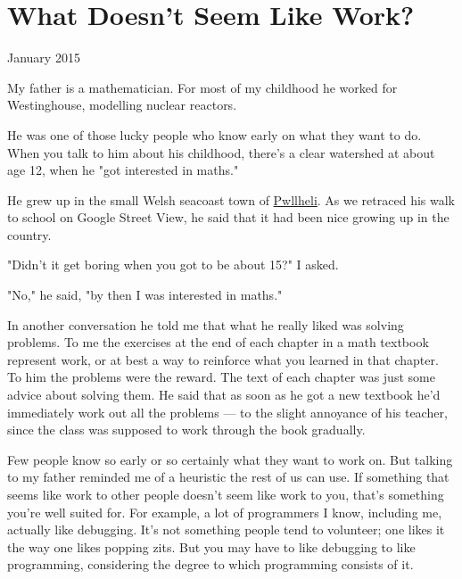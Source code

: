 \chapter{What Doesn't Seem Like Work?}


            
              
                

January 2015

My father is a mathematician. For
                  most of my childhood he worked for Westinghouse, modelling
                  nuclear reactors.

He was one of those lucky people
                  who know early on what they want to do. When you talk to him
                  about his childhood, there's a clear watershed at about age
                  12, when he "got interested in maths."

He grew up
                  in the small Welsh seacoast town of
                  \href{https://goo.gl/maps/rkzUm}{Pwllheli}. As we
                  retraced his walk to school on Google Street View, he said
                  that it had been nice growing up in the country.

"Didn't
                  it get boring when you got to be about 15?" I asked.

"No,"
                  he said, "by then I was interested in maths."

In
                  another conversation he told me that what he really liked was
                  solving problems. To me the exercises at the end of each
                  chapter in a math textbook represent work, or at best a way to
                  reinforce what you learned in that chapter. To him the
                  problems were the reward. The text of each chapter was just
                  some advice about solving them. He said that as soon as he got
                  a new textbook he'd immediately work out all the problems
                  --- to the slight annoyance of his teacher, since the
                  class was supposed to work through the book gradually.

Few
                  people know so early or so certainly what they want to work
                  on. But talking to my father reminded me of a heuristic the
                  rest of us can use. If something that seems like work to other
                  people doesn't seem like work to you, that's something you're
                  well suited for. For example, a lot of programmers I know,
                  including me, actually like debugging. It's not something
                  people tend to volunteer; one likes it the way one likes
                  popping zits. But you may have to like debugging to like
                  programming, considering the degree to which programming
                  consists of it.

